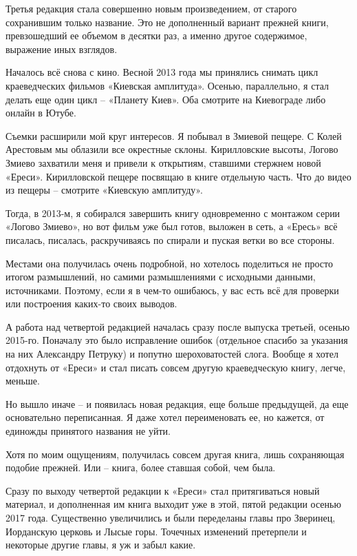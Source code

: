 Третья редакция стала совершенно новым произведением, от старого сохранившим только название. Это не дополненный вариант прежней книги, превзошедший ее объемом в десятки раз, а именно другое содержимое, выражение иных взглядов.

Началось всё снова с кино. Весной 2013 года мы принялись снимать цикл краеведческих фильмов «Киевская амплитуда». Осенью, параллельно, я стал делать еще один цикл – «Планету Киев». Оба смотрите на Киевограде либо онлайн в Ютубе. 

Съемки расширили мой круг интересов. Я побывал в Змиевой пещере. С Колей Арестовым мы облазили все окрестные склоны. Кирилловские высоты, Логово Змиево захватили меня и привели к открытиям, ставшими стержнем новой «Ереси». Кирилловской пещере посвящаю в книге отдельную часть. Что до видео из пещеры – смотрите «Киевскую амплитуду».

Тогда, в 2013-м, я собирался завершить книгу одновременно с монтажом серии «Логово Змиево», но вот фильм уже был готов, выложен в сеть, а «Ересь» всё писалась, писалась, раскручиваясь по спирали и пуская ветки во все стороны.

Местами она получилась очень подробной, но хотелось поделиться не просто итогом размышлений, но самими размышлениями с исходными данными, источниками. Поэтому, если я в чем-то ошибаюсь, у вас есть всё для проверки или построения каких-то своих выводов.

А работа над четвертой редакцией началась сразу после выпуска третьей, осенью 2015-го. Поначалу это было исправление ошибок (отдельное спасибо за указания на них Александру Петруку) и попутно шероховатостей слога. Вообще я хотел отдохнуть от «Ереси» и стал писать совсем другую краеведческую книгу, легче, меньше.

Но вышло иначе – и появилась новая редакция, еще больше предыдущей, да еще основательно переписанная. Я даже хотел переименовать ее, но кажется, от единожды принятого названия не уйти. 

Хотя по моим ощущениям, получилась совсем другая книга, лишь сохраняющая подобие прежней. Или – книга, более ставшая собой, чем была.

Сразу по выходу четвертой редакции к «Ереси» стал притягиваться новый материал, и дополненная им книга выходит уже в этой, пятой редакции осенью 2017 года. Существенно увеличились и были переделаны главы про Зверинец, Иорданскую церковь и Лысые горы. Точечных изменений претерпели и некоторые другие главы, я уж и забыл какие.

